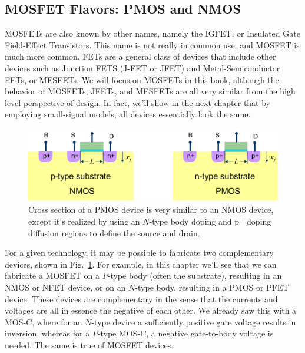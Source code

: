 \subsection{MOSFET Flavors:  PMOS and NMOS}
MOSFETs are also known by other names, namely the IGFET, or Insulated Gate Field-Effect Transistors.  This name is not really in common use, and MOSFET is much more common.  FETs are a general class of devices that include other devices such as Junction FETS (J-FET or JFET) and Metal-Semiconductor FETs, or MESFETs.  We will focus on MOSFETs in this book, although the behavior of MOSFETs, JFETs, and MESFETs are all very similar from the high level perspective of design.  In fact, we'll show in the next chapter that by employing small-signal models, all devices essentially look the same.
\begin{figure}[tb]
\centering
\includegraphics[width=.75\columnwidth]{pmos_xsect}
\caption{Cross section of a PMOS device is very similar to an NMOS device, except it's realized by using an $N$-type body doping and p$^+$ doping diffusion regions to define the source and drain.} \label{fig:pmos_xsect}
\end{figure}
For a given technology, it may be possible to fabricate two complementary devices, shown in Fig.~\ref{fig:pmos_xsect}.  For example, in this chapter we'll see that we can fabricate a MOSFET on a $P$-type body (often the substrate), resulting in an NMOS or NFET device, or on an $N$-type body, resulting in a PMOS or PFET device.  These devices are complementary in the sense that the currents and voltages are all in essence the negative of each other.  We already saw this with a MOS-C, where for an $N$-type device a sufficiently positive gate voltage results in inversion, whereas for a $P$-type MOS-C, a negative gate-to-body voltage is needed. The same is true of MOSFET devices.
